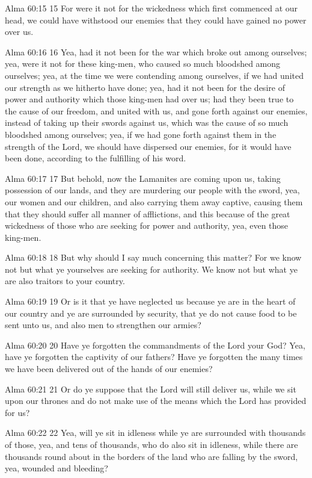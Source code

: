 Alma 60:15
 15 For were it not for the wickedness which first commenced at
our head, we could have withstood our enemies that they could
have gained no power over us.

Alma 60:16
 16 Yea, had it not been for the war which broke out among
ourselves; yea, were it not for these king-men, who caused so
much bloodshed among ourselves; yea, at the time we were
contending among ourselves, if we had united our strength as we
hitherto have done; yea, had it not been for the desire of power
and authority which those king-men had over us; had they been
true to the cause of our freedom, and united with us, and gone
forth against our enemies, instead of taking up their swords
against us, which was the cause of so much bloodshed among
ourselves; yea, if we had gone forth against them in the strength
of the Lord, we should have dispersed our enemies, for it would
have been done, according to the fulfilling of his word.

Alma 60:17
 17 But behold, now the Lamanites are coming upon us, taking
possession of our lands, and they are murdering our people with
the sword, yea, our women and our children, and also carrying
them away captive, causing them that they should suffer all
manner of afflictions, and this because of the great wickedness
of those who are seeking for power and authority, yea, even those
king-men.

Alma 60:18
 18 But why should I say much concerning this matter? For we
know not but what ye yourselves are seeking for authority. We
know not but what ye are also traitors to your country.

Alma 60:19
 19 Or is it that ye have neglected us because ye are in the
heart of our country and ye are surrounded by security, that ye
do not cause food to be sent unto us, and also men to strengthen
our armies?

Alma 60:20
 20 Have ye forgotten the commandments of the Lord your God?
Yea, have ye forgotten the captivity of our fathers? Have ye
forgotten the many times we have been delivered out of the hands
of our enemies?

Alma 60:21
 21 Or do ye suppose that the Lord will still deliver us, while
we sit upon our thrones and do not make use of the means which
the Lord has provided for us?

Alma 60:22
 22 Yea, will ye sit in idleness while ye are surrounded with
thousands of those, yea, and tens of thousands, who do also sit
in idleness, while there are thousands round about in the borders
of the land who are falling by the sword, yea, wounded and
bleeding?

